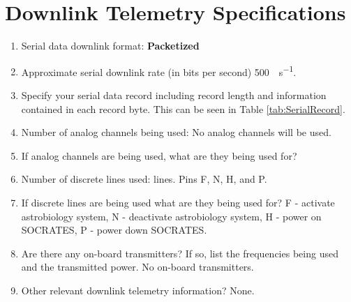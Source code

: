 
\section{Downlink Telemetry Specifications}
\label{sec:Downlink}

\hspace*{0.5cm}
\begin{minipage}{\linewidth-0.5cm}
  \begin{enumerate}[label=\Alph*.]    
  \item Serial data downlink format: \newline
    \textbf{Packetized}
  \item Approximate serial downlink rate (in bits per second) \newline
    \SI{500}{\bit\per\second}.
  \item Specify your serial data record including record length and information contained in each record byte. \newline
    This can be seen in Table \ref{tab:SerialRecord}.
  \item Number of analog channels being used:
    No analog channels will be used.
  \item If analog channels are being used, what are they being used for?
  \item Number of discrete lines used:  lines. Pins F, N, H, and P.
  \item If discrete lines are being used what are they being used for? \newline
    F - activate astrobiology system, N - deactivate astrobiology system, H - power on SOCRATES, P - power down SOCRATES.
  \item Are there any on-board transmitters? If so, list the frequencies being used and the transmitted power. \newline
    No on-board transmitters.
  \item Other relevant downlink telemetry information? \newline
    None.
  \end{enumerate}
\end{minipage}

